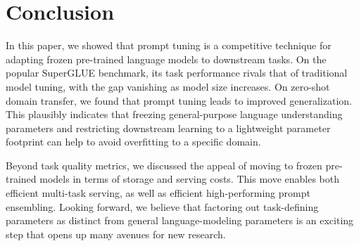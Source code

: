 \section{Conclusion}

In this paper, we showed that prompt tuning is a competitive technique for adapting frozen pre-trained language models to downstream tasks. On the popular SuperGLUE benchmark, its task performance rivals that of traditional model tuning, with the gap vanishing as model size increases. On zero-shot domain transfer, we found that prompt tuning leads to improved generalization. This plausibly indicates that freezing general-purpose language understanding parameters and restricting downstream learning to a lightweight parameter footprint can help to avoid overfitting to a specific domain.

Beyond task quality metrics, we discussed the appeal of moving to frozen pre-trained models in terms of storage and serving costs. This move enables both efficient multi-task serving, as well as efficient high-performing prompt ensembling. Looking forward, we believe that factoring out task-defining parameters as distinct from general language-modeling parameters is an exciting step that opens up many avenues for new research.



